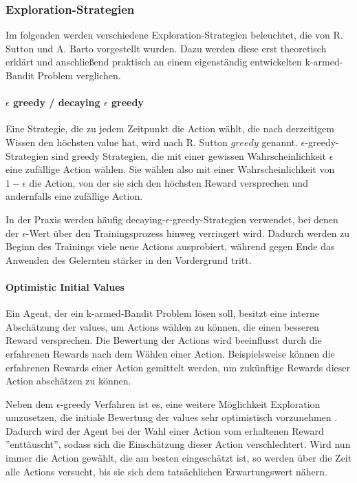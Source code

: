 \documentclass[11pt]{scrartcl}
\begin{document}
\subsubsection{Exploration-Strategien}
Im folgenden werden verschiedene Exploration-Strategien beleuchtet, die von R. Sutton und
A. Barto \cite[~S.19]{SB1998} vorgestellt wurden. Dazu werden diese erst theoretisch
erklärt und anschließend praktisch an einem eigenständig entwickelten k-armed-Bandit
Problem verglichen.

\paragraph{$\epsilon$ greedy / decaying $\epsilon$ greedy}
Eine Strategie, die zu jedem Zeitpunkt die Action wählt, die nach derzeitigem Wissen den
höchsten value hat, wird nach R. Sutton \cite[~S.20]{SB1998} $greedy$ genannt.
$\epsilon$-greedy-Strategien sind greedy Strategien, die mit einer gewissen
Wahrscheinlichkeit $\epsilon$ eine zufällige Action wählen. Sie wählen also mit einer
Wahrscheinlichkeit von $1 - \epsilon$ die Action, von der sie sich den höchsten Reward
versprechen und andernfalls eine zufällige Action.

In der Praxis werden häufig decaying-$\epsilon$-greedy-Strategien verwendet, bei denen der
$\epsilon$-Wert über den Trainingsprozess hinweg verringert wird. Dadurch werden zu Beginn
des Trainings viele neue Actions ausprobiert, während gegen Ende das Anwenden des
Gelernten stärker in den Vordergrund tritt.

\paragraph{Optimistic Initial Values}
Ein Agent, der ein k-armed-Bandit Problem lösen soll, besitzt eine interne Abschätzung der
values, um Actions wählen zu können, die einen besseren Reward versprechen. Die
Bewertung der Actions wird beeinflusst durch die erfahrenen Rewards nach dem Wählen einer
Action. Beispielsweise können die erfahrenen Rewards einer Action gemittelt werden, um
zukünftige Rewards dieser Action abschätzen zu können.

Neben dem $\epsilon$-greedy Verfahren ist es, eine weitere Möglichkeit Exploration umzusetzen,
die initiale Bewertung der values sehr optimistisch vorzunehmen \cite[~S.26]{SB1998}.
Dadurch wird der Agent bei der Wahl einer Action vom erhaltenen Reward ''enttäuscht'',
sodass sich die Einschätzung dieser Action verschlechtert. Wird nun immer die Action
gewählt, die am besten eingeschätzt ist, so werden über die Zeit alle Actions versucht,
bis sie sich dem tatsächlichen Erwartungswert nähern.
\end{document}
